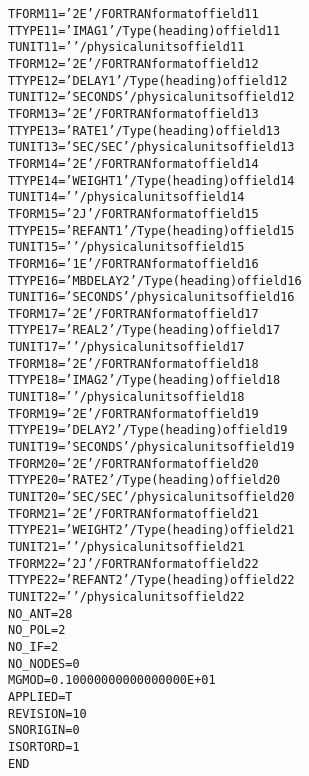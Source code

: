\documentclass[twoside]{article}
\begin{document}
\begin{alltt}
TFORM11 = '2E      '           / FORTRAN format of field 11
TTYPE11 = 'IMAG1           '   / Type (heading) of field 11
TUNIT11 = '        '           / physical units of field 11
TFORM12 = '2E      '           / FORTRAN format of field 12
TTYPE12 = 'DELAY 1         '   / Type (heading) of field 12
TUNIT12 = 'SECONDS '           / physical units of field 12
TFORM13 = '2E      '           / FORTRAN format of field 13
TTYPE13 = 'RATE 1          '   / Type (heading) of field 13
TUNIT13 = 'SEC/SEC '           / physical units of field 13
TFORM14 = '2E      '           / FORTRAN format of field 14
TTYPE14 = 'WEIGHT 1        '   / Type (heading) of field 14
TUNIT14 = '        '           / physical units of field 14
TFORM15 = '2J      '           / FORTRAN format of field 15
TTYPE15 = 'REFANT 1        '   / Type (heading) of field 15
TUNIT15 = '        '           / physical units of field 15
TFORM16 = '1E      '           / FORTRAN format of field 16
TTYPE16 = 'MBDELAY2        '   / Type (heading) of field 16
TUNIT16 = 'SECONDS '           / physical units of field 16
TFORM17 = '2E      '           / FORTRAN format of field 17
TTYPE17 = 'REAL2           '   / Type (heading) of field 17
TUNIT17 = '        '           / physical units of field 17
TFORM18 = '2E      '           / FORTRAN format of field 18
TTYPE18 = 'IMAG2           '   / Type (heading) of field 18
TUNIT18 = '        '           / physical units of field 18
TFORM19 = '2E      '           / FORTRAN format of field 19
TTYPE19 = 'DELAY 2         '   / Type (heading) of field 19
TUNIT19 = 'SECONDS '           / physical units of field 19
TFORM20 = '2E      '           / FORTRAN format of field 20
TTYPE20 = 'RATE 2          '   / Type (heading) of field 20
TUNIT20 = 'SEC/SEC '           / physical units of field 20
TFORM21 = '2E      '           / FORTRAN format of field 21
TTYPE21 = 'WEIGHT 2        '   / Type (heading) of field 21
TUNIT21 = '        '           / physical units of field 21
TFORM22 = '2J      '           / FORTRAN format of field 22
TTYPE22 = 'REFANT 2        '   / Type (heading) of field 22
TUNIT22 = '        '           / physical units of field 22
NO_ANT  =           28
NO_POL  =            2
NO_IF   =            2
NO_NODES=            0
MGMOD   =   0.10000000000000000E+01
APPLIED =                    T
REVISION=           10
SNORIGIN=            0
ISORTORD=                   1
END
\end{alltt}
\end{document}
